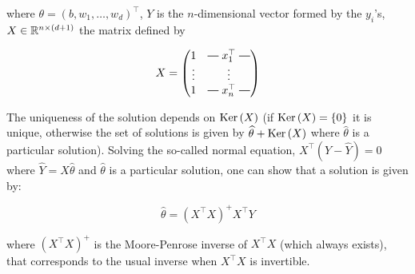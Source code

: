 \documentclass[a4paper, 11pt]{article}
\begin{document}
where $\theta = \left( b, w_{1}, \dots, w_{d} \right)^\top$, $Y$ is the $n$-dimensional vector formed by the $y_{i}$'s, $X \in \mathbb{R}^{n \times (d+1)}$ the matrix defined by
    
\begin{equation*}
    X = \begin{pmatrix} 
            1 & \protect\rotvert\; x_{1}^\top \;\protect\rotvert \\
            \vdots & \vdots \\
            1 & \protect\rotvert\; x_{n}^\top \;\protect\rotvert
        \end{pmatrix}
\end{equation*}
    
The uniqueness of the solution depends on $\operatorname{Ker} \left( X \right)$ (if $\operatorname{Ker} \left( X \right) = \left\{ 0 \right\}$ it is unique, otherwise the set of solutions is given by $\widehat{\theta} + \operatorname{Ker} \left( X \right)$ where $\widehat{\theta}$ is a particular solution). Solving the so-called normal equation, $X^\top \left( Y - \widehat{Y} \right) = 0$ where $\widehat{Y} = X \widehat{\theta}$ and $\widehat{\theta}$ is a particular solution, one can show that a solution is given by:
    
\begin{equation*}
    \widehat{\theta} = \left( X^\top X \right)^{+} X^\top Y
\end{equation*}
    
where $\left( X^\top X \right)^{+}$ is the Moore-Penrose inverse of $X^\top X$ (which always exists), that corresponds to the usual inverse when $X^\top X$ is invertible.
    
\end{document}
